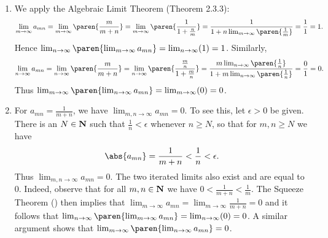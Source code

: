 \documentclass{lew98_solutions}
\begin{document}
\begin{solution}
    \begin{enumerate}
        \item We apply the Algebraic Limit Theorem (Theorem 2.3.3):
        \[
            \lim_{m \to \infty} a_{mn} = \lim_{m \to \infty} \paren{ \frac{m}{m + n} } = \lim_{m \to \infty} \paren{ \frac{1}{1 + \frac{n}{m}} } = \frac{1}{1 + n \lim_{m \to \infty} \paren{ \frac{1}{m} }} = \frac{1}{1} = 1.
        \]
        Hence \( \lim_{n \to \infty} \paren{ \lim_{m \to \infty} a_{mn} } = \lim_{n \to \infty} (1) = 1 \). Similarly,
        \[
            \lim_{n \to \infty} a_{mn} = \lim_{n \to \infty} \paren{ \frac{m}{m + n} } = \lim_{n \to \infty} \paren{ \frac{\frac{m}{n}}{1 + \frac{m}{n}} } = \frac{m \lim_{n \to \infty} \paren{ \frac{1}{n} }}{1 + m \lim_{n \to \infty} \paren{ \frac{1}{n} }} = \frac{0}{1} = 0.
        \]
        Thus \( \lim_{m \to \infty} \paren{ \lim_{n \to \infty} a_{mn} } = \lim_{m \to \infty} (0) = 0 \).

        \item For \( a_{mn} = \tfrac{1}{m + n} \), we have \( \lim_{m, n \to \infty} a_{mn} = 0 \). To see this, let \( \epsilon > 0 \) be given. There is an \( N \in \mathbf{N} \) such that \( \tfrac{1}{n} < \epsilon \) whenever \( n \geq N \), so that for \( m, n \geq N \) we have
        \[
            \abs{a_{mn}} = \frac{1}{m + n} < \frac{1}{n} < \epsilon.
        \]
        Thus \( \lim_{m, n \to \infty} a_{mn} = 0 \). The two iterated limits also exist and are equal to 0. Indeed, observe that for all \( m, n \in \mathbf{N} \) we have \( 0 < \tfrac{1}{m + n} < \tfrac{1}{m} \). The Squeeze Theorem () then implies that \( \lim_{m \to \infty} a_{mn} = \lim_{m \to \infty} \tfrac{1}{m + n} = 0 \) and it follows that \( \lim_{n \to \infty} \paren{ \lim_{m \to \infty} a_{mn} } = \lim_{n \to \infty} (0) = 0 \). A similar argument shows that \( \lim_{m \to \infty} \paren{ \lim_{n \to \infty} a_{mn} } = 0 \).


\end{enumerate}
\end{solution}
\end{document}
